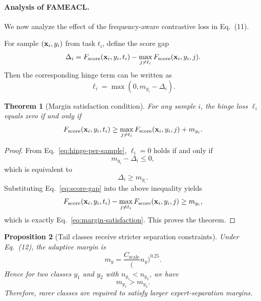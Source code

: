 \documentclass[journal]{IEEEtran}
\theoremstyle{plain}
\newtheorem{theorem}{Theorem}[section]
\newtheorem{proposition}[theorem]{Proposition}
\theoremstyle{definition}
\theoremstyle{remark}
\begin{document}
\paragraph{Analysis of FAMEACL.}
We now analyze the effect of the frequency-aware contrastive loss in Eq.~(11).

For sample $({\bf x}_i,y_i)$ from task $t_i$, define the score gap
\begin{equation}
\Delta_i
=
F_{\mathrm{score}}({\bf x}_i,y_i,t_i)
-
\max_{j\neq t_i}F_{\mathrm{score}}({\bf x}_i,y_i,j).
\label{eq:score-gap}
\end{equation}
Then the corresponding hinge term can be written as
\begin{equation}
\ell_i=\max(0,m_{y_i}-\Delta_i).
\label{eq:hinge-per-sample}
\end{equation}

\begin{theorem}[Margin satisfaction condition]
\label{thm:margin-condition}
For any sample $i$, the hinge loss $\ell_i$ equals zero if and only if
\begin{equation}
F_{\mathrm{score}}({\bf x}_i,y_i,t_i)
\ge
\max_{j\neq t_i}F_{\mathrm{score}}({\bf x}_i,y_i,j)+m_{y_i}.
\label{eq:margin-satisfaction}
\end{equation}
\end{theorem}

\begin{proof}
From Eq.~\eqref{eq:hinge-per-sample}, $\ell_i=0$ holds if and only if
\begin{equation}
m_{y_i}-\Delta_i\le 0,
\end{equation}
which is equivalent to
\begin{equation}
\Delta_i\ge m_{y_i}.
\end{equation}
Substituting Eq.~\eqref{eq:score-gap} into the above inequality yields
\begin{equation}
F_{\mathrm{score}}({\bf x}_i,y_i,t_i)
-
\max_{j\neq t_i}F_{\mathrm{score}}({\bf x}_i,y_i,j)
\ge m_{y_i},
\end{equation}
which is exactly Eq.~\eqref{eq:margin-satisfaction}. This proves the theorem.
\end{proof}

\begin{proposition}[Tail classes receive stricter separation constraints]
\label{prop:tail-margin}
Under Eq.~(12), the adaptive margin is
\begin{equation}
m_y=\frac{C_{\mathrm{scale}}}({n_y})^{0.25}.
\end{equation}
Hence for two classes $y_1$ and $y_2$ with $n_{y_1}<n_{y_2}$, we have
\begin{equation}
m_{y_1}>m_{y_2}.
\end{equation}
Therefore, rarer classes are required to satisfy larger expert-separation margins.
\end{proposition}
\end{document}
